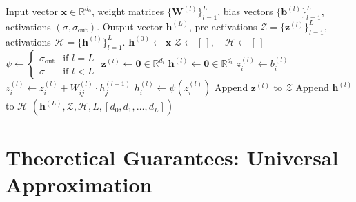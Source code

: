 \documentclass[11pt]{article}
\begin{document}
\begin{algorithm}[H]
\caption{Deterministic MLP Feedforward Evaluation}
\label{alg:mlp_feedforward}
\begin{algorithmic}[1]
\Require Input vector $\mathbf{x} \in \mathbb{R}^{d_0}$, weight matrices $\{\mathbf{W}^{(l)}\}_{l=1}^L$, bias vectors $\{\mathbf{b}^{(l)}\}_{l=1}^L$, activations $(\sigma, \sigma_{\text{out}})$.
\Ensure Output vector $\mathbf{h}^{(L)}$, pre-activations $\mathcal{Z} = \{\mathbf{z}^{(l)}\}_{l=1}^L$, activations $\mathcal{H} = \{\mathbf{h}^{(l)}\}_{l=1}^L$.
\State $\mathbf{h}^{(0)} \gets \mathbf{x}$
\State $\mathcal{Z} \gets [\,], \quad \mathcal{H} \gets [\,]$
    \State $\psi \gets \begin{cases} \sigma_{\text{out}} & \text{if } l = L \\ \sigma & \text{if } l < L \end{cases}$
    \State $\mathbf{z}^{(l)} \gets \mathbf{0} \in \mathbb{R}^{d_l}$
    \State $\mathbf{h}^{(l)} \gets \mathbf{0} \in \mathbb{R}^{d_l}$
        \State $z_i^{(l)} \gets b_i^{(l)}$
            \State $z_i^{(l)} \gets z_i^{(l)} + W_{ij}^{(l)} \cdot h_j^{(l-1)}$
        \EndFor
        \State $h_i^{(l)} \gets \psi(z_i^{(l)})$
    \EndFor
    \State Append $\mathbf{z}^{(l)}$ to $\mathcal{Z}$
    \State Append $\mathbf{h}^{(l)}$ to $\mathcal{H}$
\EndFor
\State \Return $(\mathbf{h}^{(L)}, \mathcal{Z}, \mathcal{H}, L, [d_0, d_1, \dots, d_L])$
\end{algorithmic}
\end{algorithm}

\section{Theoretical Guarantees: Universal Approximation}
\label{sec:correctness}
\end{document}
